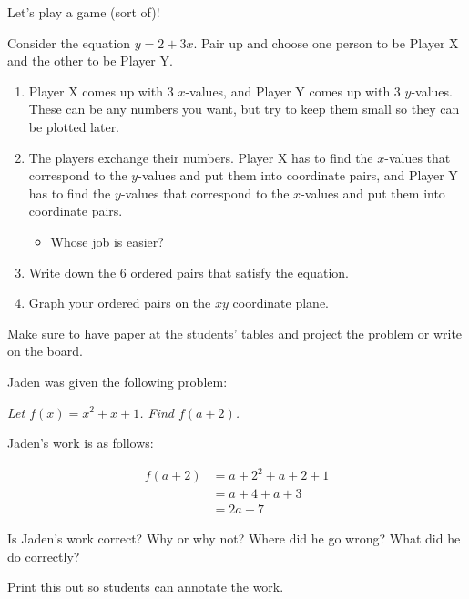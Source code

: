 \documentclass[noauthor,noinstructornotes]{ximera}
\begin{document}
\begin{problem}
Let's play a game (sort of)!

Consider the equation \(y = 2 + 3x\). Pair up and 
    choose one person to be Player X and the other
    to be Player Y.
    \begin{enumerate}
        \item Player X comes up with 3 \(x\)-values, and 
        Player Y comes up with 3 \(y\)-values. 
        These can be any numbers you want, but try 
        to keep them small so they can be plotted 
        later.
        \item The players exchange their numbers. 
        Player X has to find the \(x\)-values that 
        correspond to the \(y\)-values and put 
        them into coordinate pairs, and Player Y 
        has to find the \(y\)-values that 
        correspond to the \(x\)-values and put 
        them into coordinate pairs. 
        \begin{itemize}
            \item Whose job is easier?
        \end{itemize}
        \item Write down the 6 
        ordered pairs that satisfy the equation.
        \item Graph your ordered pairs on the \(xy\)
        coordinate plane.
    \end{enumerate}


\begin{instructorNotes}
Make sure to have paper at the students' tables and project
the problem or write on the board.
\end{instructorNotes}
\end{problem}

\begin{problem}
Jaden was given the following problem:

\textit{Let \(f(x) = x^2 + x + 1\). Find \(f(a + 2)\).}

Jaden's work is as follows:

\begin{align*}
    f(a + 2) & = a + 2^2 + a + 2 + 1 \\
    & = a + 4 + a + 3 \\
    & = 2a + 7
\end{align*}

Is Jaden's work correct? Why or why not? Where did he 
go wrong? What did he do correctly?

\begin{instructorNotes}
Print this out so students can annotate the work.
\end{instructorNotes}
\end{problem}
\end{document}
